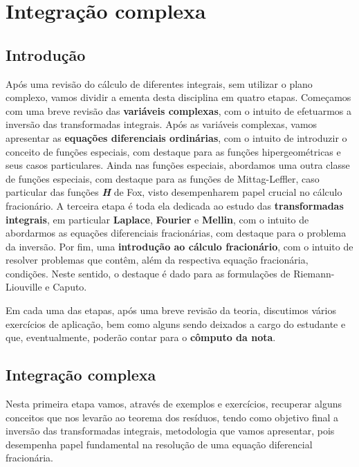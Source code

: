 
\chapter{Integração complexa}

\section{Introdução}

Após uma revisão do cálculo de diferentes integrais, sem utilizar o plano complexo, vamos dividir a ementa desta disciplina em quatro etapas. Começamos com uma breve revisão das \textbf{variáveis complexas}, com o intuito de efetuarmos a inversão das transformadas integrais. Após as variáveis complexas, vamos apresentar as \textbf{equações diferenciais ordinárias}, com o intuito de introduzir o conceito de funções especiais, com destaque para as funções hipergeométricas e seus casos particulares. Ainda nas funções especiais, abordamos uma outra classe de funções especiais, com destaque para as funções de Mittag-Leffler, caso particular das funções \textbf{\textit{H}} de Fox, visto desempenharem papel crucial no cálculo fracionário. A terceira etapa é toda ela dedicada ao estudo das \textbf{transformadas integrais}, em particular \textbf{Laplace}, \textbf{Fourier} e \textbf{Mellin}, com o intuito de abordarmos as equações diferenciais fracionárias, com destaque para o problema da inversão. Por fim, uma \textbf{introdução ao cálculo fracionário}, com o intuito de resolver problemas que contêm, além da respectiva equação fracionária, condições. Neste sentido, o destaque é dado para as formulações de Riemann-Liouville e Caputo.

Em cada uma das etapas, após uma breve revisão da teoria, discutimos vários exercícios de aplicação, bem como alguns sendo deixados a cargo do estudante e que, eventualmente, poderão contar para o \textbf{cômputo da nota}.

\section{Integração complexa}

Nesta primeira etapa vamos, através de exemplos e exercícios, recuperar alguns conceitos que nos levarão ao teorema dos resíduos, tendo como objetivo final a inversão das transformadas integrais, metodologia que vamos apresentar, pois desempenha papel fundamental na resolução de uma equação diferencial fracionária.



